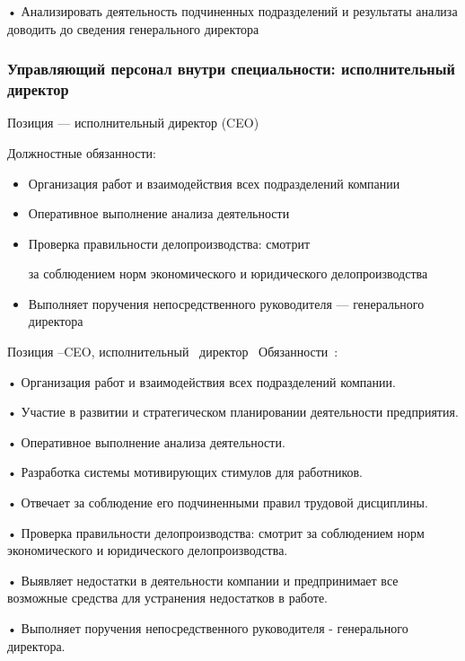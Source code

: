 \documentclass{../industrial-development}
\begin{document}
•	Анализировать деятельность подчиненных подразделений и результаты анализа доводить до сведения генерального директора


\begin{frame} \frametitle{Управляющий персонал внутри специальности: исполнительный директор}
 \begin{block}{}
  \alert{Позиция --- исполнительный директор (CEO)}

Должностные обязанности: 
  \end{block}
  \begin{itemize}
  \item Организация работ и взаимодействия всех подразделений компании
 \item Оперативное выполнение анализа деятельности
 \item Проверка правильности делопроизводства: смотрит 

за соблюдением норм экономического и юридического делопроизводства
  \item Выполняет поручения непосредственного руководителя --- генерального директора
  \end{itemize}
\end{frame}

\lecturenotes

Позиция –CEO, исполнительный~\cite{hh} директор~\cite{itcf}
Обязанности~\cite{rab}:

•	Организация работ и взаимодействия всех подразделений компании. 

•	Участие в развитии и стратегическом планировании деятельности предприятия. 

•	Оперативное выполнение анализа деятельности. 

•	Разработка системы мотивирующих стимулов для работников. 

•	Отвечает за соблюдение его подчиненными правил трудовой дисциплины. 

•	Проверка правильности делопроизводства: смотрит за соблюдением норм экономического и юридического делопроизводства.

•	 Выявляет недостатки в деятельности компании и предпринимает все возможные средства для устранения недостатков в работе. 

•	Выполняет поручения непосредственного руководителя - генерального директора. 
\end{document}
